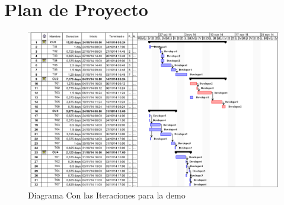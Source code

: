 
\section{Plan de Proyecto}

\begin{figure}[h!]
  \centering
  \includegraphics[width=1\textwidth]{plan.png}
  \caption{Diagrama Con las Iteraciones para la demo}
  \label{fig:clases4}
\end{figure}

\clearpage

